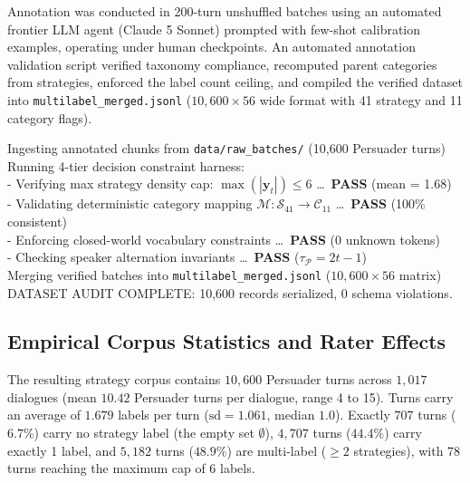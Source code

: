 Annotation was conducted in 200-turn unshuffled batches using an automated frontier LLM agent (Claude 5 Sonnet) prompted with few-shot calibration examples, operating under human checkpoints. An automated annotation validation script verified taxonomy compliance, recomputed parent categories from strategies, enforced the label count ceiling, and compiled the verified dataset into \texttt{multilabel\_merged.jsonl} ($10{,}600 \times 56$ wide format with 41 strategy and 11 category flags).

\begin{terminalbox} Ingesting annotated chunks from \texttt{data/raw\_batches/} (10,600 Persuader turns) \\ \relax
[+] Running 4-tier decision constraint harness: \\ \relax
\hspace*{1.5em}- Verifying max strategy density cap: $\max(|\mathbf{y}_t|) \le 6$ \dots\ \textbf{PASS} (mean = 1.68) \\ \relax
\hspace*{1.5em}- Validating deterministic category mapping $\mathcal{M}: \mathcal{S}_{41} \to \mathcal{C}_{11}$ \dots\ \textbf{PASS} (100\% consistent) \\ \relax
\hspace*{1.5em}- Enforcing closed-world vocabulary constraints \dots\ \textbf{PASS} (0 unknown tokens) \\ \relax
\hspace*{1.5em}- Checking speaker alternation invariants \dots\ \textbf{PASS} ($\tau_{\mathcal{P}} = 2t - 1$) \\ \relax
[*] Merging verified batches into \texttt{multilabel\_merged.jsonl} ($10{,}600 \times 56$ matrix) \\ \relax
[+] DATASET AUDIT COMPLETE: 10,600 records serialized, 0 schema violations.
\end{terminalbox}

\subsection{Empirical Corpus Statistics and Rater Effects}
The resulting strategy corpus contains $10{,}600$ Persuader turns across $1{,}017$ dialogues (mean $10.42$ Persuader turns per dialogue, range 4 to 15). Turns carry an average of $1.679$ labels per turn ($\text{sd} = 1.061$, median $1.0$). Exactly $707$ turns ($6.7\%$) carry no strategy label (the empty set $\emptyset$), $4{,}707$ turns ($44.4\%$) carry exactly 1 label, and $5{,}182$ turns ($48.9\%$) are multi-label ($\ge 2$ strategies), with 78 turns reaching the maximum cap of 6 labels.

